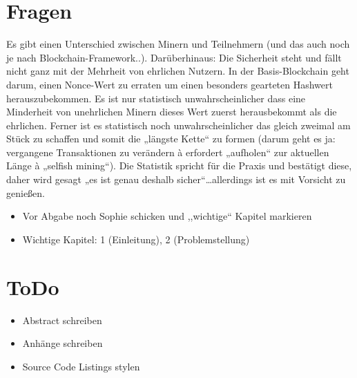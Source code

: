 \section*{Fragen}
    Es gibt einen Unterschied zwischen Minern und Teilnehmern (und das auch noch je nach Blockchain-Framework..). Darüberhinaus: Die Sicherheit steht und fällt nicht ganz mit der Mehrheit von ehrlichen Nutzern. In der Basis-Blockchain geht darum, einen Nonce-Wert zu erraten um einen besonders gearteten Hashwert herauszubekommen. Es ist nur statistisch unwahrscheinlicher dass eine Minderheit von unehrlichen Minern dieses Wert zuerst herausbekommt als die ehrlichen. Ferner ist es statistisch noch unwahrscheinlicher das gleich zweimal am Stück zu schaffen und somit die „längste Kette“ zu formen (darum geht es ja: vergangene Transaktionen zu verändern à erfordert „aufholen“ zur aktuellen Länge à „selfish mining“). Die Statistik spricht für die Praxis und bestätigt diese, daher wird gesagt „es ist genau deshalb sicher“…allerdings ist es mit Vorsicht zu genießen.
    
    \begin{itemize}
        \item Vor Abgabe noch Sophie schicken und ,,wichtige`` Kapitel markieren
        \item Wichtige Kapitel: 1 (Einleitung), 2 (Problemstellung)
    \end{itemize}
    
\section*{ToDo}
    \begin{itemize}[noitemsep]
        \item Abstract schreiben
        \item Anhänge schreiben
        \item Source Code Listings stylen
    \end{itemize}
    
